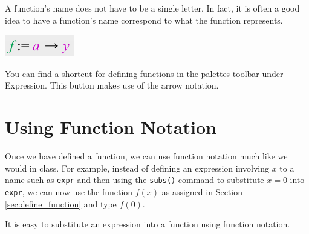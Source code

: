 A function's name does not have to be a single letter. In fact, it is often a good idea to have a function's name correspond to what the function represents.

\begin{maplegroup}
\begin{mapleinput}
\end{mapleinput}
\mapleresult
\begin{maplelatex}
\end{maplelatex}
\end{maplegroup}

\begin{marginfigure}
\centering
\includegraphics[scale=0.8]{tutorials/figures/palettefunc.png}
\caption{You can find a shortcut for defining functions in the palettes toolbar under Expression. This button makes use of the arrow notation.}
\end{marginfigure}

\section{Using Function Notation}

Once we have defined a function, we can use function notation much like we would in class. For example, instead of defining an expression involving $x$ to a name such as \texttt{expr} and then using the \texttt{subs()} command to substitute $x=0$ into \texttt{expr}, we can now use the function $f(x)$ as assigned in Section \ref{sec:define_function} and type $f(0)$.

\begin{maplegroup}
\begin{mapleinput}
\end{mapleinput}
\mapleresult
\begin{maplelatex}
\end{maplelatex}
\end{maplegroup}

It is easy to substitute an expression into a function using function notation.

\begin{maplegroup}
\begin{mapleinput}
\end{mapleinput}
\mapleresult
\begin{maplelatex}
\end{maplelatex}
\end{maplegroup}


